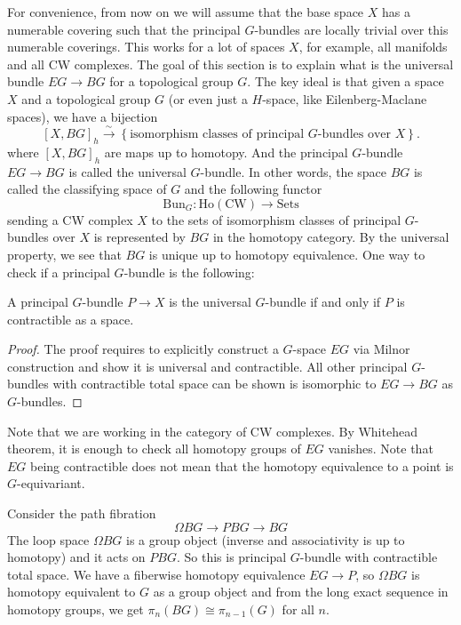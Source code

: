 For convenience, from now on we will assume that the base space \(X\) has a numerable covering such that the principal \(G\)-bundles are locally trivial over this numerable coverings. This works for a lot of spaces \(X\), for example, all manifolds and all CW complexes. The goal of this section is to explain what is the universal bundle \(EG\rightarrow BG\) for a topological group \(G\). The key ideal is that given a space \(X\) and a topological group \(G\) (or even just a \(H\)-space, like Eilenberg-Maclane spaces), we have a bijection
\[
     [X, BG]_h \xrightarrow{\sim}
     \left\{ \text{isomorphism classes of principal $G$-bundles over $X$} \right\}.
\]
where \([X,BG]_h\) are maps up to homotopy. And the principal \(G\)-bundle \(EG\rightarrow BG\) is called the universal \(G\)-bundle. In other words, the space \(BG\) is called the classifying space of \(G\) and the following functor 
\[\mathrm{Bun}_G: \mathrm{Ho}(\mathrm{CW})\rightarrow \mathrm{Sets}\]
sending a CW complex \(X\) to the sets of isomorphism classes of principal \(G\)-bundles over \(X\) is represented by \(BG\) in the homotopy category. By the universal property, we see that \(BG\) is unique up to homotopy equivalence. One way to check if a principal \(G\)-bundle is the following:

\begin{proposition}
     A principal \(G\)-bundle \(P\rightarrow X\) is the universal \(G\)-bundle if and only if \(P\) is contractible as a space.
\end{proposition}

\begin{proof}
    The proof requires to explicitly construct a \(G\)-space \(EG\) via Milnor construction and show it is universal and contractible. All other principal \(G\)-bundles with contractible total space can be shown is isomorphic to \(EG\rightarrow BG\) as \(G\)-bundles.
\end{proof}

Note that we are working in the category of CW complexes. By Whitehead theorem, it is enough to check all homotopy groups of \(EG\) vanishes. Note that \(EG\) being contractible does not mean that the homotopy equivalence to a point is \(G\)-equivariant. 

\begin{remark}
     Consider the path fibration 
     \[\Omega BG\rightarrow PBG\rightarrow BG\]
     The loop space \(\Omega BG\) is a group object (inverse and associativity is up to homotopy) and it acts on \(PBG\). So this is principal \(G\)-bundle with contractible total space. We have a fiberwise homotopy equivalence \(EG\rightarrow P\), so \(\Omega BG\) is homotopy equivalent to \(G\) as a group object and from the long exact sequence in homotopy groups, we get \(\pi_n(BG)\cong \pi_{n-1}(G)\) for all \(n\).
\end{remark}

